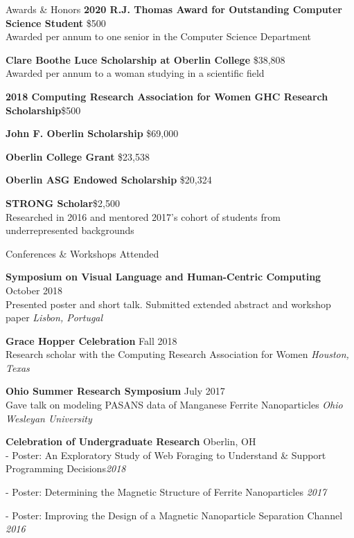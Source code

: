 \documentclass{resume}
\begin{document}
\begin{rSection}{Awards \& Honors} 
{\bf 2020 R.J. Thomas Award for Outstanding Computer Science Student} \hfill{\$500} \\
Awarded per annum to one senior in the Computer Science Department

{\bf Clare Boothe Luce Scholarship at Oberlin College} \hfill{\$38,808} \\
Awarded per annum to a woman studying in a scientific field

{\bf 2018 Computing Research Association for Women GHC Research Scholarship}\hfill{\$500} 

{\bf John F. Oberlin Scholarship } \hfill{\$69,000}

{\bf Oberlin College Grant } \hfill {\$23,538}

{\bf Oberlin ASG Endowed Scholarship} \hfill {\$20,324}

{\bf STRONG Scholar}\hfill{\$2,500} \\
 Researched in 2016 and mentored 2017's cohort of students from underrepresented backgrounds
\end{rSection}

\begin{rSection} {Conferences \& Workshops Attended}

{\bf Symposium on Visual Language and Human-Centric Computing} \hfill {October 2018} \\
Presented poster and short talk. Submitted extended abstract and workshop paper \hfill {\em Lisbon, Portugal}

{\bf Grace Hopper Celebration} \hfill {Fall 2018} \\
Research scholar with the Computing Research Association for Women \hfill {\em Houston, Texas}

{\bf Ohio Summer Research Symposium} \hfill {July 2017}\\
Gave talk on modeling PASANS data of Manganese Ferrite Nanoparticles \hfill {\em Ohio Wesleyan University}

{\bf Celebration of Undergraduate Research} \hfill {Oberlin, OH} \\
 {- Poster: An Exploratory Study of Web Foraging to Understand \& Support Programming Decisions}\hfill {\em 2018} 
 
 {- Poster: Determining the Magnetic Structure of Ferrite Nanoparticles} \hfill {\em 2017} 
 
 {- Poster: Improving the Design of a Magnetic Nanoparticle Separation Channel} \hfill {\em 2016}
\end{rSection}
\end{document}

